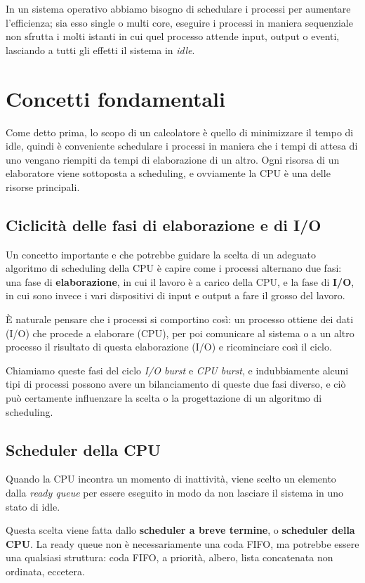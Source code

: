 In un sistema operativo abbiamo bisogno di schedulare i processi per aumentare l'efficienza; sia esso single o multi core, eseguire i processi in maniera sequenziale non sfrutta i molti istanti in cui quel processo attende input, output o eventi, lasciando a tutti gli effetti il sistema in \textit{idle}.

\section{Concetti fondamentali}
    Come detto prima, lo scopo di un calcolatore è quello di minimizzare il tempo di idle, quindi è conveniente schedulare i processi in maniera che i tempi di attesa di uno vengano riempiti da tempi di elaborazione di un altro. Ogni risorsa di un elaboratore viene sottoposta a scheduling, e ovviamente la CPU è una delle risorse principali.
    
    \subsection{Ciclicità delle fasi di elaborazione e di I/O}
        Un concetto importante e che potrebbe guidare la scelta di un adeguato algoritmo di scheduling della CPU è capire come i processi alternano due fasi: una fase di \textbf{elaborazione}, in cui il lavoro è a carico della CPU, e la fase di \textbf{I/O}, in cui sono invece i vari dispositivi di input e output a fare il grosso del lavoro.
        
        È naturale pensare che i processi si comportino così: un processo ottiene dei dati (I/O) che procede a elaborare (CPU), per poi comunicare al sistema o a un altro processo il risultato di questa elaborazione (I/O) e ricominciare così il ciclo.
        
        Chiamiamo queste fasi del ciclo \textit{I/O burst} e \textit{CPU burst}, e indubbiamente alcuni tipi di processi possono avere un bilanciamento di queste due fasi diverso, e ciò può certamente influenzare la scelta o la progettazione di un algoritmo di scheduling.
        
    \subsection{Scheduler della CPU}
        Quando la CPU incontra un momento di inattività, viene scelto un elemento dalla \textit{ready queue} per essere eseguito in modo da non lasciare il sistema in uno stato di idle.
        
        Questa scelta viene fatta dallo \textbf{scheduler a breve termine}, o \textbf{scheduler della CPU}. La ready queue non è necessariamente una coda FIFO, ma potrebbe essere una qualsiasi struttura: coda FIFO, a priorità, albero, lista concatenata non ordinata, eccetera.
        
